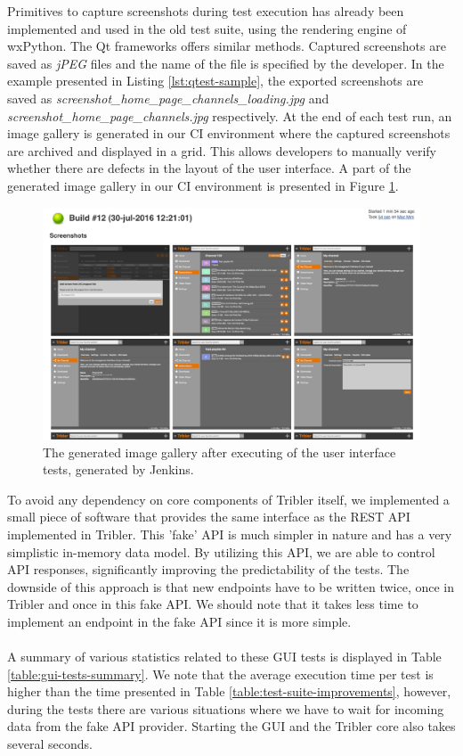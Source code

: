 Primitives to capture screenshots during test execution has already been implemented and used in the old test suite, using the rendering engine of wxPython. The Qt frameworks offers similar methods. Captured screenshots are saved as \emph{jPEG} files and the name of the file is specified by the developer. In the example presented in Listing \ref{lst:qtest-sample}, the exported screenshots are saved as \emph{screenshot\_home\_page\_channels\_loading.jpg} and \emph{screenshot\_home\_page\_channels.jpg} respectively. At the end of each test run, an image gallery is generated in our CI environment where the captured screenshots are archived and displayed in a grid. This allows developers to manually verify whether there are defects in the layout of the user interface. A part of the generated image gallery in our CI environment is presented in Figure \ref{fig:jenkins-gallery}.\\

\begin{figure}[h!]
	\centering
	\includegraphics[width=1.0\columnwidth]{images/improving_qa/gallery_jenkins}
	\caption{The generated image gallery after executing of the user interface tests, generated by Jenkins.}
	\label{fig:jenkins-gallery}
\end{figure}

To avoid any dependency on core components of Tribler itself, we implemented a small piece of software that provides the same interface as the REST API implemented in Tribler. This 'fake' API is much simpler in nature and has a very simplistic in-memory data model. By utilizing this API, we are able to control API responses, significantly improving the predictability of the tests. The downside of this approach is that new endpoints have to be written twice, once in Tribler and once in this fake API. We should note that it takes less time to implement an endpoint in the fake API since it is more simple.\\\\
A summary of various statistics related to these GUI tests is displayed in Table \ref{table:gui-tests-summary}. We note that the average execution time per test is higher than the time presented in Table \ref{table:test-suite-improvements}, however, during the tests there are various situations where we have to wait for incoming data from the fake API provider. Starting the GUI and the Tribler core also takes several seconds.


